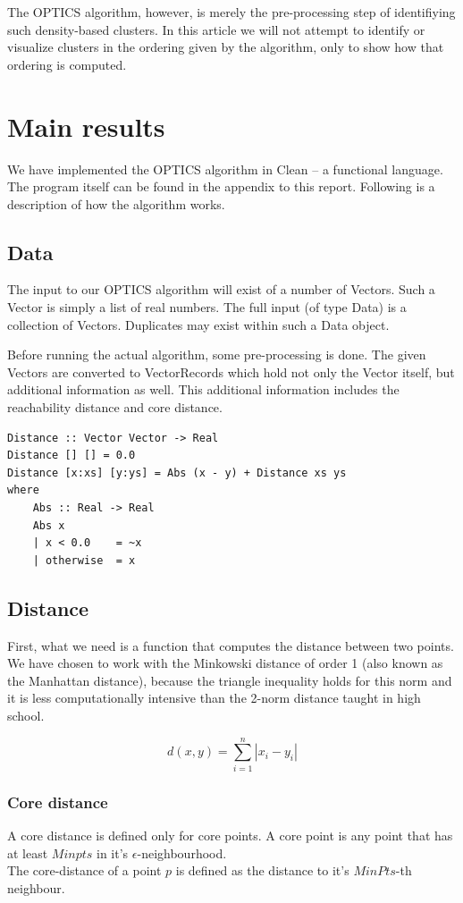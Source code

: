 \documentclass[12pt,a4paper]{article}
\begin{document}
The OPTICS algorithm, however, is merely the pre-processing step of identifiying such density-based clusters. In this article we will not attempt to identify or visualize clusters in the ordering given by the algorithm, only to show how that ordering is computed.

\clearpage
\section{Main results}
We have implemented the OPTICS algorithm in Clean – a functional language. The program itself can be found in the appendix to this report. Following is a description of how the algorithm works.

\subsection{Data}
The input to our OPTICS algorithm will exist of a number of Vectors. Such a Vector is simply a list of real numbers. The full input (of type Data) is a collection of Vectors. Duplicates may exist within such a Data object.

Before running the actual algorithm, some pre-processing is done. The given Vectors are converted to VectorRecords which hold not only the Vector itself, but additional information as well. This additional information includes the reachability distance and core distance.

\begin{verbatim}
Distance :: Vector Vector -> Real
Distance [] [] = 0.0
Distance [x:xs] [y:ys] = Abs (x - y) + Distance xs ys
where
    Abs :: Real -> Real
    Abs x
    | x < 0.0    = ~x
    | otherwise  = x
\end{verbatim}

\subsection{Distance}
First, what we need is a function that computes the distance between two points. We have chosen to work with the Minkowski distance of order 1 (also known as the Manhattan distance), because the triangle inequality holds for this norm and it is less computationally intensive than the 2-norm distance taught in high school.

\begin{equation}
d(x,y)=\sum_{i=1}^n |x_i-y_i|
\end{equation}

\subsubsection{Core distance}
A core distance is defined only for core points. A core point is any point that has at least $Minpts$ in it's $\epsilon$-neighbourhood.\\
The core-distance of a point $p$ is defined as the distance to it's $MinPts$-th neighbour.
\end{document}
